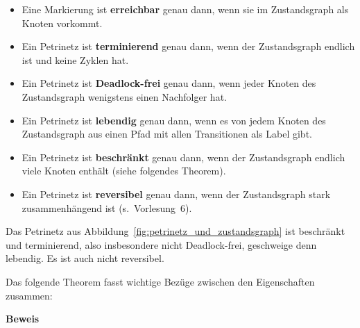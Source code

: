 \begin{itemize}
	\item Eine Markierung ist \textbf{erreichbar} genau dann, wenn sie im Zustandsgraph als Knoten vorkommt.
	\item Ein Petrinetz ist \textbf{terminierend} genau dann, wenn der Zustandsgraph endlich ist und keine Zyklen hat.
	\item Ein Petrinetz ist \textbf{Deadlock-frei} genau dann, wenn jeder Knoten des Zustandsgraph wenigstens einen Nachfolger hat.
	\item Ein Petrinetz ist \textbf{lebendig} genau dann, wenn es von jedem Knoten des Zustandsgraph aus einen Pfad mit allen Transitionen als Label gibt.
	\item Ein Petrinetz ist \textbf{beschränkt} genau dann, wenn der Zustandsgraph endlich viele Knoten enthält (siehe folgendes Theorem).
	\item Ein Petrinetz ist \textbf{reversibel} genau dann, wenn der Zustandsgraph stark 
	\linebreak %
	zusammenhängend ist (s.~Vorlesung~6).
\end{itemize}

Das Petrinetz aus Abbildung~\ref{fig:petrinetz_und_zustandsgraph} ist beschränkt und terminierend, also insbesondere nicht Deadlock-frei, geschweige denn lebendig. Es ist auch nicht reversibel.

\pagebreak %

Das folgende Theorem fasst wichtige Bezüge zwischen den Eigenschaften zusammen:


\textbf{Beweis}

